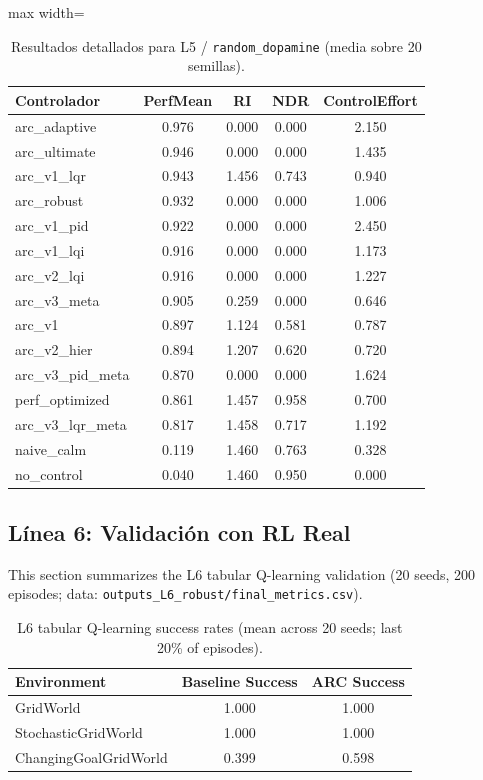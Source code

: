 \documentclass{article}
\begin{document}
\begin{table}[H]
\centering
\footnotesize
\caption{Resultados detallados para L5 / \texttt{random\_dopamine} (media sobre 20 semillas).}
\label{tab:g11_random_dopamine}
\begin{adjustbox}{max width=\textwidth}
\begin{tabular}{@{}lcccc@{}}
\toprule
Controlador & PerfMean & RI & NDR & ControlEffort \\ \midrule
arc\_adaptive & 0.976 & 0.000 & 0.000 & 2.150 \\
arc\_ultimate & 0.946 & 0.000 & 0.000 & 1.435 \\
arc\_v1\_lqr & 0.943 & 1.456 & 0.743 & 0.940 \\
arc\_robust & 0.932 & 0.000 & 0.000 & 1.006 \\
arc\_v1\_pid & 0.922 & 0.000 & 0.000 & 2.450 \\
arc\_v1\_lqi & 0.916 & 0.000 & 0.000 & 1.173 \\
arc\_v2\_lqi & 0.916 & 0.000 & 0.000 & 1.227 \\
arc\_v3\_meta & 0.905 & 0.259 & 0.000 & 0.646 \\
arc\_v1 & 0.897 & 1.124 & 0.581 & 0.787 \\
arc\_v2\_hier & 0.894 & 1.207 & 0.620 & 0.720 \\
arc\_v3\_pid\_meta & 0.870 & 0.000 & 0.000 & 1.624 \\
perf\_optimized & 0.861 & 1.457 & 0.958 & 0.700 \\
arc\_v3\_lqr\_meta & 0.817 & 1.458 & 0.717 & 1.192 \\
naive\_calm & 0.119 & 1.460 & 0.763 & 0.328 \\
no\_control & 0.040 & 1.460 & 0.950 & 0.000 \\ \bottomrule
\end{tabular}
\end{adjustbox}
\end{table}

\FloatBarrier
\subsection{Línea 6: Validación con RL Real}

This section summarizes the L6 tabular Q-learning validation (20 seeds, 200 episodes; data: \texttt{outputs\_L6\_robust/final\_metrics.csv}).

\begin{table}[H]
\centering
\footnotesize
\caption{L6 tabular Q-learning success rates (mean across 20 seeds; last 20\% of episodes).}
\label{tab:g12_l6_success}
\begin{tabular}{@{}lcc@{}}
\toprule
Environment & Baseline Success & ARC Success \\ \midrule
GridWorld & 1.000 & 1.000 \\
StochasticGridWorld & 1.000 & 1.000 \\
ChangingGoalGridWorld & 0.399 & 0.598 \\ \bottomrule
\end{tabular}
\end{table}
\end{document}
